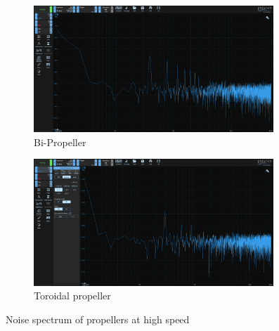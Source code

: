 \documentclass[8pt]{article}
\begin{document}
\begin{figure}[H]
    \begin{subfigure}{0.99\textwidth}
        \centering
        \includegraphics[width=0.99\textwidth]{hispeed_biprop.png}
        \caption{Bi-Propeller}
        \label{fig:hispeed_biprop}
    \end{subfigure}
    \begin{subfigure}{0.99\textwidth}
        \centering
        \includegraphics[width=0.99\textwidth]{hispeed_toroid.png}
        \caption{Toroidal propeller}
        \label{fig:hispeed_toroid}
    \end{subfigure}
    \caption{Noise spectrum of propellers at high speed}
    \label{fig:noise_spectrum_hispeed}
\end{figure}
\end{document}
